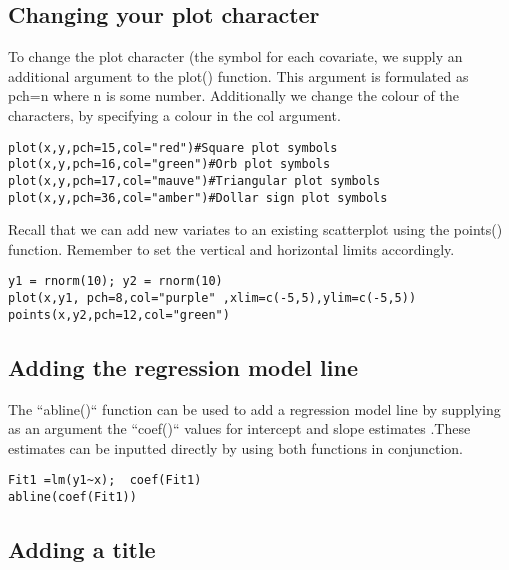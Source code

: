 \begin{itemize}
\subsection{Changing your plot character}

To change the plot character (the symbol for each covariate, we supply an additional argument to the plot() function.  This argument is formulated as pch=n where n is some number.
Additionally we change the colour of the characters, by specifying a colour in the col argument.
\large \begin{verbatim}
plot(x,y,pch=15,col="red")#Square plot symbols
plot(x,y,pch=16,col="green")#Orb plot symbols
plot(x,y,pch=17,col="mauve")#Triangular plot symbols
plot(x,y,pch=36,col="amber")#Dollar sign plot symbols
\end{verbatim}\large
Recall that we can add new variates to an existing scatterplot using the points() function. Remember to set the vertical and horizontal limits accordingly.
\large \begin{verbatim}
y1 = rnorm(10); y2 = rnorm(10)
plot(x,y1, pch=8,col="purple" ,xlim=c(-5,5),ylim=c(-5,5))
points(x,y2,pch=12,col="green")
\end{verbatim}\large
\subsection{Adding the regression model line}

The ``abline()`` function can be used to add a regression model line  by supplying as an argument the ``coef()`` values for intercept and slope estimates .These estimates can be inputted directly by using both functions in conjunction.

\large \begin{verbatim}
Fit1 =lm(y1~x);  coef(Fit1)
abline(coef(Fit1))
\end{verbatim}\large

\subsection{Adding a title }


\end{itemize}
